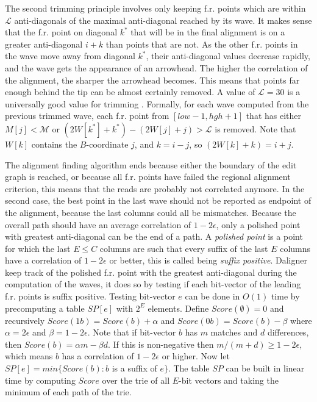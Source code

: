 \documentclass[../thesis.tex]{subfiles}
\begin{document}


The second trimming principle involves only keeping f.r. points which are within $\mathcal{L}$ anti-diagonals of the maximal anti-diagonal reached by its wave.
It makes sense that the f.r. point on diagonal $k^*$ that will be in the final alignment is on a greater anti-diagonal $i+k$ than points that are not.
As the other f.r. points in the wave move away from diagonal $k^*$, their anti-diagonal values decrease rapidly, and the wave gets the appearance of an arrowhead.
The higher the correlation of the alignment, the sharper the arrowhead becomes.
This means that points far enough behind the tip can be almost certainly removed.
A value of $\mathcal{L} = 30$ is a universally good value for trimming \cite{Daligner}.
Formally, for each wave computed from the previous trimmed wave, each f.r. point from $[low-1,hgh+1]$ that has either $M[j]<\mathcal{M}$ or $(2W[k^*]+k^*) - (2W[j]+j) > \mathcal{L}$ is removed.
Note that $W[k]$ contains the $B$-coordinate $j$, and $k=i-j$, so $(2W[k]+k) = i+j$.

The alignment finding algorithm ends because either the boundary of the edit graph is reached, or because all f.r. points have failed the regional alignment criterion, this means that the reads are probably not correlated anymore.
In the second case, the best point in the last wave should not be reported as endpoint of the alignment, because the last columns could all be mismatches.
Because the overall path should have an average correlation of $1-2\epsilon$, only a polished point with greatest anti-diagonal can be the end of a path.
A \textit{polished point} is a point for which the last $E\le C$ columns are such that every suffix of the last $E$ columns have a correlation of $1-2\epsilon$ or better, this is called being \textit{suffix positive}.
Daligner keep track of the polished f.r. point with the greatest anti-diagonal during the computation of the waves, it does so by testing if each bit-vector of the leading f.r. points is suffix positive.
Testing bit-vector $e$ can be done in $O(1)$ time by precomputing a table $SP[e]$ with $2^E$ elements.
Define $Score(\emptyset)=0$ and recursively $Score(1b) = Score(b) + \alpha$ and $Score(0b) = Score(b) - \beta$ where $\alpha = 2\epsilon$ and $\beta = 1-2\epsilon$.
Note that if bit-vector $b$ has $m$ matches and $d$ differences, then $Score(b) = \alpha m - \beta d$.
If this is non-negative then $m/(m+d) \ge 1-2\epsilon$, which means $b$ has a correlation of $1-2\epsilon$ or higher.
Now let $SP[e] = min\{Score(b): b$ is a suffix of $e\}$.
The table $SP$ can be built in linear time by computing $Score$ over the trie \cite{trie1}\cite{trie2} of all $E$-bit vectors and taking the minimum of each path of the trie.
\end{document}
